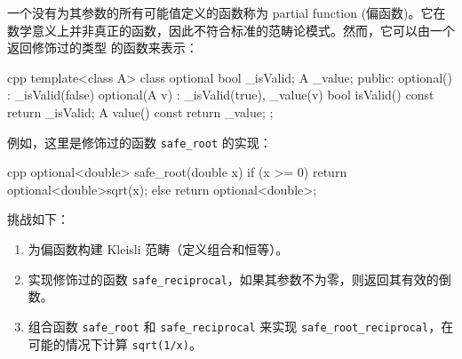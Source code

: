 一个没有为其参数的所有可能值定义的函数称为 partial function (偏函数)。它在数学意义上并非真正的函数，因此不符合标准的范畴论模式。然而，它可以由一个返回修饰过的类型 的函数来表示：

\begin{snip}{cpp}
template<class A> class optional {
    bool _isValid;
    A _value;
public:
    optional()    : _isValid(false) {}
    optional(A v) : _isValid(true), _value(v) {}
    bool isValid() const { return _isValid; }
    A value() const { return _value; }
};
\end{snip}
例如，这里是修饰过的函数 \texttt{safe\_root} 的实现：

\begin{snip}{cpp}
optional<double> safe_root(double x) {
    if (x >= 0) return optional<double>{sqrt(x)};
    else return optional<double>{};
}
\end{snip}
挑战如下：

\begin{enumerate}
  \tightlist
  \item
        为偏函数构建 Kleisli 范畴（定义组合和恒等）。
  \item
        实现修饰过的函数 \texttt{safe\_reciprocal}，如果其参数不为零，则返回其有效的倒数。
  \item
        组合函数 \texttt{safe\_root} 和 \texttt{safe\_reciprocal} 来实现 \texttt{safe\_root\_reciprocal}，在可能的情况下计算 \texttt{sqrt(1/x)}。
\end{enumerate}
